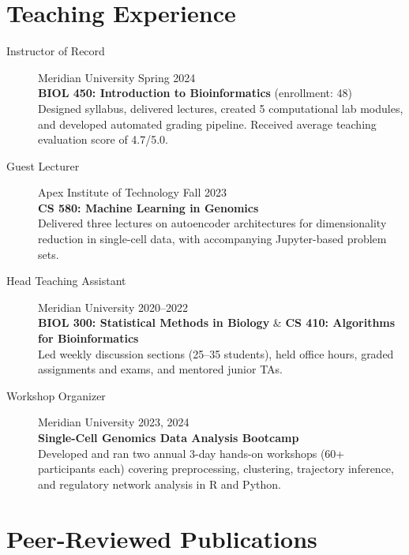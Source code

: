 \documentclass[11pt,a4paper]{article}
\begin{document}
\section{Teaching Experience}

\begin{description}
  \item[Instructor of Record] Meridian University \hfill Spring 2024\\
  \textbf{BIOL 450: Introduction to Bioinformatics} (enrollment: 48)\\[2pt]
  Designed syllabus, delivered lectures, created 5 computational lab modules, and developed automated grading pipeline. Received average teaching evaluation score of 4.7/5.0.

  \item[Guest Lecturer] Apex Institute of Technology \hfill Fall 2023\\
  \textbf{CS 580: Machine Learning in Genomics}\\[2pt]
  Delivered three lectures on autoencoder architectures for dimensionality reduction in single-cell data, with accompanying Jupyter-based problem sets.

  \item[Head Teaching Assistant] Meridian University \hfill 2020--2022\\
  \textbf{BIOL 300: Statistical Methods in Biology} \& \textbf{CS 410: Algorithms for Bioinformatics}\\[2pt]
  Led weekly discussion sections (25--35 students), held office hours, graded assignments and exams, and mentored junior TAs.

  \item[Workshop Organizer] Meridian University \hfill 2023, 2024\\
  \textbf{Single-Cell Genomics Data Analysis Bootcamp}\\[2pt]
  Developed and ran two annual 3-day hands-on workshops (60+ participants each) covering preprocessing, clustering, trajectory inference, and regulatory network analysis in R and Python.
\end{description}

\section{Peer-Reviewed Publications}
\end{document}
